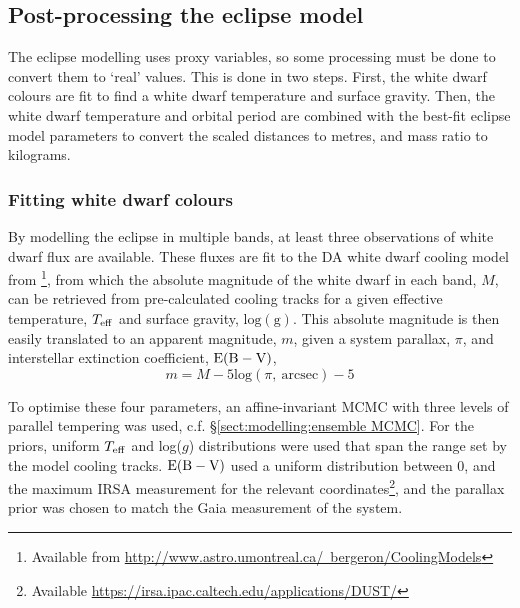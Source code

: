 \subsection{Post-processing the eclipse model}
\label{sect:modelling:post processing the eclipse model}

The eclipse modelling uses proxy variables, so some processing must be done to convert them to `real' values. This is done in two steps. First, the white dwarf colours are fit to find a white dwarf temperature and surface gravity. Then, the white dwarf temperature and orbital period are combined with the best-fit eclipse model parameters to convert the scaled distances to metres, and mass ratio to kilograms. 

\subsubsection{Fitting white dwarf colours}
\label{sect:modelling:fitting white dwarf colours}
By modelling the eclipse in multiple bands, at least three observations of white dwarf flux are available. These fluxes are fit to the DA white dwarf cooling model from \citet{Bergeron1995}\footnote{Available from \href{http://www.astro.umontreal.ca/~bergeron/CoolingModels}{http://www.astro.umontreal.ca/~bergeron/CoolingModels}}, from which the absolute magnitude of the white dwarf in each band, $M$, can be retrieved from pre-calculated cooling tracks for a given effective temperature, $T_{\rm eff}$ and surface gravity, $\mathrm{log(g)}$. This absolute magnitude is then easily translated to an apparent magnitude, $m$, given a system parallax, $\pi$, and interstellar extinction coefficient, $\rm E(B-V)$,
\begin{equation}
    m = M - 5\mathrm{log}(\pi\mathrm{,\ arcsec}) - 5
\end{equation}

To optimise these four parameters, an affine-invariant MCMC with three levels of parallel tempering was used, c.f. \S\ref{sect:modelling:ensemble MCMC}. For the priors, uniform $T_{\rm eff}$ and log($g$) distributions were used that span the range set by the model cooling tracks. $\rm E(B-V)$ used a uniform distribution between 0, and the maximum IRSA measurement for the relevant coordinates\footnote{Available \href{https://irsa.ipac.caltech.edu/applications/DUST/}{https://irsa.ipac.caltech.edu/applications/DUST/}}, and the parallax prior was chosen to match the Gaia measurement \citep{lindegren2018, Luri2018, Gaia2016, Gaia2018} of the system. 


